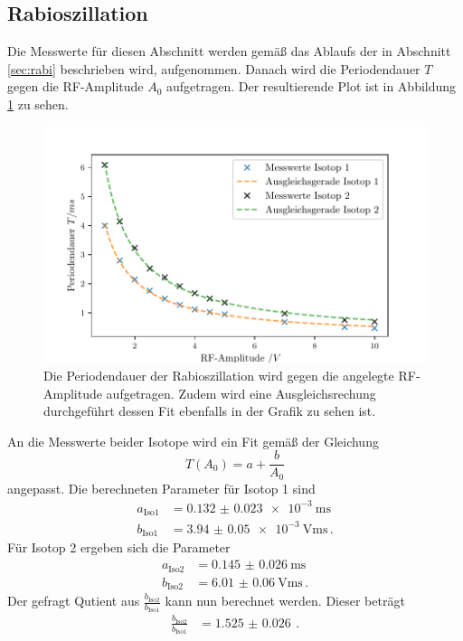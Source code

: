 \subsection{Rabioszillation}
Die Messwerte für diesen Abschnitt werden gemäß das Ablaufs der in Abschnitt \ref{sec:rabi} beschrieben wird, aufgenommen.
Danach wird die Periodendauer $T$ gegen die RF-Amplitude $A_0$ aufgetragen.
Der resultierende Plot ist in Abbildung \ref{fig:rabi} zu sehen.
\begin{figure}
    \centering
    \includegraphics[width=\textwidth]{content/plots/periodendauer.pdf}
    \caption{Die Periodendauer der Rabioszillation wird gegen die angelegte RF-Amplitude aufgetragen.
    Zudem wird eine Ausgleichsrechung durchgeführt dessen Fit ebenfalls in der Grafik zu sehen ist.}
    \label{fig:rabi}
\end{figure}
An die Messwerte beider Isotope wird ein Fit gemäß der Gleichung 
\begin{equation*}
    T(A_0) = a + \frac{b}{A_0}
\end{equation*}
angepasst.
Die berechneten Parameter für Isotop 1 sind 
\begin{align*}
    a_\text{Iso1} &= \SI{0.132(23)e-3}{\ms}\\
    b_\text{Iso1} &= \SI{3.94(5)e-3}{\V\ms} \, .
\end{align*}
Für Isotop 2 ergeben sich die Parameter 
\begin{align*}
    a_\text{Iso2} &= \SI{0.145(26)}{\ms}\\
    b_\text{Iso2} &= \SI{6.01(6)}{\V\ms} \, .
\end{align*}
Der gefragt Qutient aus $\frac{b_\text{Iso2}}{b_\text{Iso1}}$ kann nun berechnet werden.
Dieser beträgt 
\begin{align*}
    \frac{b_\text{Iso2}}{b_\text{Iso1}} &= \SI{1.525(26)}{} \, .
\end{align*}
